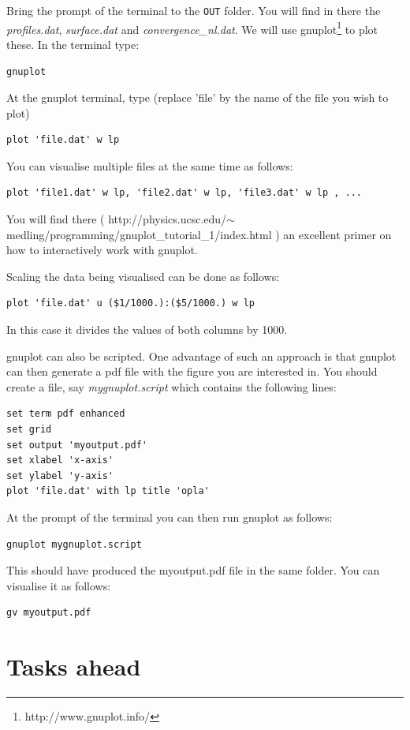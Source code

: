 Bring the prompt of the terminal to the {\tt OUT} folder. You will find in there the 
{\sl profiles.dat}, {\sl surface.dat} and {\sl convergence\_nl.dat}.
We will use gnuplot\footnote{http://www.gnuplot.info/} to plot these. In the terminal type:
\begin{verbatim}
gnuplot
\end{verbatim}
At the gnuplot terminal, type (replace 'file' by the name of the file you wish to plot)
\begin{verbatim}
plot 'file.dat' w lp 
\end{verbatim}

You can visualise multiple files at the same time as follows:
\begin{verbatim}
plot 'file1.dat' w lp, 'file2.dat' w lp, 'file3.dat' w lp , ... 
\end{verbatim}
You will find there ( http://physics.ucsc.edu/$\sim$medling/programming/gnuplot\_tutorial\_1/index.html ) 
an excellent primer on how to interactively work with gnuplot.

Scaling the data being visualised can be done as follows:
\begin{verbatim}
plot 'file.dat' u ($1/1000.):($5/1000.) w lp
\end{verbatim}
In this case it divides the values of both columns by 1000.

gnuplot can also be scripted. One advantage of such an approach is that gnuplot can then generate a pdf 
file with the figure you are interested in. You should create a file, say {\sl mygnuplot.script} which contains the following lines:
\begin{verbatim}
set term pdf enhanced
set grid
set output 'myoutput.pdf'
set xlabel 'x-axis'
set ylabel 'y-axis'
plot 'file.dat' with lp title 'opla'
\end{verbatim}

At the prompt of the terminal you can then run gnuplot as follows:
\begin{verbatim}
gnuplot mygnuplot.script
\end{verbatim}
This should have produced the myoutput.pdf file in the same folder.
You can visualise it as follows:
\begin{verbatim}
gv myoutput.pdf
\end{verbatim}

\section*{Tasks ahead}

